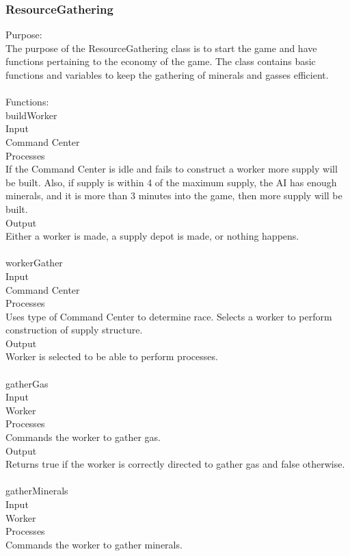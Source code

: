\documentclass[10pt,letterpaper,onecolumn,draftclsnofoot]{IEEEtran}
\begin{document}
\subsubsection{ResourceGathering}
Purpose:\\
The purpose of the ResourceGathering class is to start the game and have functions pertaining to the economy of the game. The class contains basic functions and variables to keep the gathering of minerals and gasses efficient.\\
\\
Functions:\\
buildWorker\\
Input\\
Command Center\\
Processes\\
If the Command Center is idle and fails to construct a worker more supply will be built. Also, if supply is within 4 of the maximum supply, the AI has enough minerals, and it is more than 3 minutes into the game, then more supply will be built.\\
Output\\
Either a worker is made, a supply depot is made, or nothing happens.\\
\\
workerGather\\
Input\\
Command Center\\
Processes\\
Uses type of Command Center to determine race. Selects a worker to perform construction of supply structure.\\
Output\\
Worker is selected to be able to perform processes.\\
\\
gatherGas\\
Input\\
Worker\\
Processes\\
Commands the worker to gather gas.\\
Output\\
Returns true if the worker is correctly directed to gather gas and false otherwise.\\
\\
gatherMinerals\\
Input\\
Worker\\
Processes\\
Commands the worker to gather minerals.\\
\end{document}
